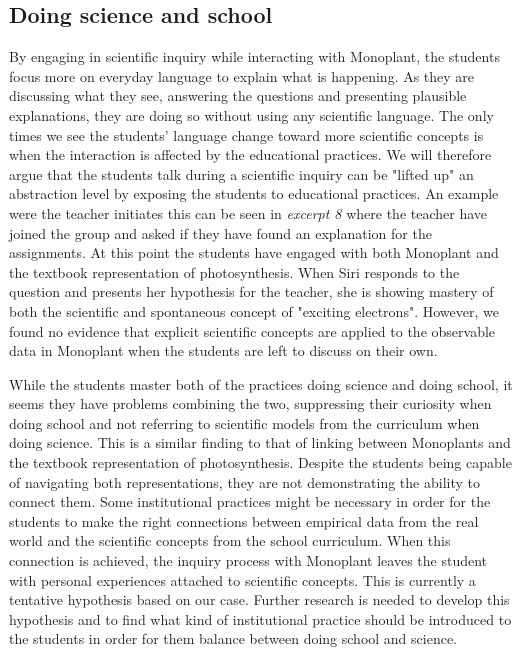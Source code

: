 \subsection{Doing science and school}
By engaging in scientific inquiry while interacting with Monoplant, the students focus more on everyday language to explain what is happening. As they are discussing what they see, answering the questions and presenting plausible explanations, they are doing so without using any scientific language. The only times we see the students' language change toward more scientific concepts is when the interaction is affected by the educational practices. We will therefore argue that the students talk during a scientific inquiry can be "lifted up" an abstraction level by exposing the students to educational practices. An example were the teacher initiates this can be seen in \emph{excerpt 8} where the teacher have joined the group and asked if they have found an explanation for the assignments. At this point the students have engaged with both Monoplant and the textbook representation of photosynthesis. When Siri responds to the question and presents her hypothesis for the teacher, she is showing mastery of both the scientific and spontaneous concept of "exciting electrons". However, we found no evidence that explicit scientific concepts are applied to the observable data in Monoplant when the students are left to discuss on their own. 

While the students master both of the practices doing science and doing school, it seems they have problems combining the two, suppressing their curiosity when doing school and not referring to scientific models from the curriculum when doing science. This is a similar finding to that of linking between Monoplants and the textbook representation of photosynthesis. Despite the students being capable of navigating both representations, they are not demonstrating the ability to connect them. Some institutional practices might be necessary in order for the students to make the right connections between empirical data from the real world and the scientific concepts from the school curriculum. When this connection is achieved, the inquiry process with Monoplant leaves the student with personal experiences attached to scientific concepts. This is currently a tentative hypothesis based on our case. Further research is needed to develop this hypothesis and to find what kind of institutional practice should be introduced to the students in order for them balance between doing school and science.



